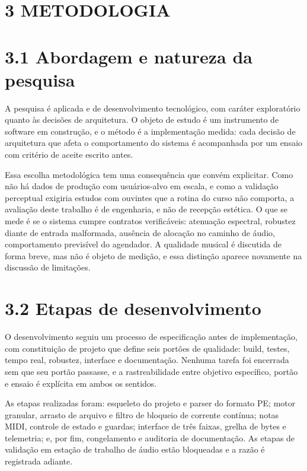 \documentclass[12pt,a4paper]{article}
\begin{document}
\section*{3 METODOLOGIA}

\section*{3.1 Abordagem e natureza da pesquisa}

A pesquisa é aplicada e de desenvolvimento tecnológico, com caráter exploratório quanto às decisões de arquitetura. O objeto de estudo é um instrumento de software em construção, e o método é a implementação medida: cada decisão de arquitetura que afeta o comportamento do sistema é acompanhada por um ensaio com critério de aceite escrito antes.


Essa escolha metodológica tem uma consequência que convém explicitar. Como não há dados de produção com usuários-alvo em escala, e como a validação perceptual exigiria estudos com ouvintes que a rotina do curso não comporta, a avaliação deste trabalho é de engenharia, e não de recepção estética. O que se mede é se o sistema cumpre contratos verificáveis: atenuação espectral, robustez diante de entrada malformada, ausência de alocação no caminho de áudio, comportamento previsível do agendador. A qualidade musical é discutida de forma breve, mas não é objeto de medição, e essa distinção aparece novamente na discussão de limitações.


\section*{3.2 Etapas de desenvolvimento}

O desenvolvimento seguiu um processo de especificação antes de implementação, com constituição de projeto que define seis portões de qualidade: build, testes, tempo real, robustez, interface e documentação. Nenhuma tarefa foi encerrada sem que seu portão passasse, e a rastreabilidade entre objetivo específico, portão e ensaio é explícita em ambos os sentidos.


As etapas realizadas foram: esqueleto do projeto e parser do formato PE; motor granular, arrasto de arquivo e filtro de bloqueio de corrente contínua; notas MIDI, controle de estado e guardas; interface de três faixas, grelha de bytes e telemetria; e, por fim, congelamento e auditoria de documentação. As etapas de validação em estação de trabalho de áudio estão bloqueadas e a razão é registrada adiante.
\end{document}
